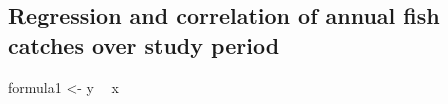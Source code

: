 \documentclass[
]{article}
\newenvironment{Shaded}{\begin{snugshade}}{\end{snugshade}}
\newcommand{\CommentTok}[1]{\textcolor[rgb]{0.56,0.35,0.01}{\textit{#1}}}
\newcommand{\NormalTok}[1]{#1}
\newcommand{\OperatorTok}[1]{\textcolor[rgb]{0.81,0.36,0.00}{\textbf{#1}}}
\newcommand{\StringTok}[1]{\textcolor[rgb]{0.31,0.60,0.02}{#1}}
\begin{document}
\begin{Shaded}
\begin{Highlighting}[]
{{{\CommentTok{# catch.clean.group.outlierfree %>% distinct(Month)}
\end{Highlighting}
\end{Shaded}

\hypertarget{regression-and-correlation-of-annual-fish-catches-over-study-period}{%
\subsection{Regression and correlation of annual fish catches over study period}\label{regression-and-correlation-of-annual-fish-catches-over-study-period}}

\begin{Shaded}
\begin{Highlighting}[]
\NormalTok{formula1 <-}\StringTok{ }\NormalTok{y }\OperatorTok{~}\StringTok{ }\NormalTok{x}


\end{Highlighting}
\end{Shaded}
\end{document}
